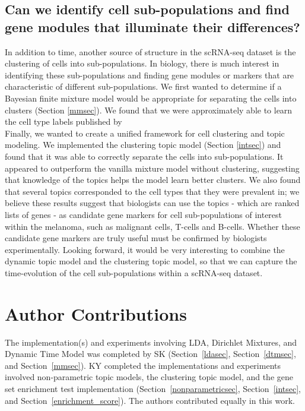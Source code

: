 \documentclass{article}
\begin{document}
\subsection{Can we identify cell sub-populations and find gene modules that illuminate their differences?}
In addition to time, another source of structure in the scRNA-seq dataset is the clustering of cells into sub-populations. In biology, there is much interest in identifying these sub-populations and finding gene modules or markers that are characteristic of different sub-populations. We first wanted to determine if a Bayesian finite mixture model would be appropriate for separating the cells into clusters (Section \ref{mmsec}). We found that we were approximately able to learn the cell type labels published by \cite{melanoma}\\

Finally, we wanted to create a unified framework for cell clustering and topic modeling. We implemented the clustering topic model (Section \ref{intsec}) and found that it was able to correctly separate the cells into sub-populations. It appeared to outperform the vanilla mixture model without clustering, suggesting that knowledge of the topics helps the model learn better clusters. We also found that several topics corresponded to the cell types that they were prevalent in; we believe these results suggest that biologists can use the topics - which are ranked lists of genes - as candidate gene markers for cell sub-populations of interest within the melanoma, such as malignant cells, T-cells and B-cells. Whether these candidate gene markers are truly useful must be confirmed by biologists experimentally. Looking forward, it would be very interesting to combine the dynamic topic model and the clustering topic model, so that we can capture the time-evolution of the cell sub-populations within a scRNA-seq dataset. 


\section{Author Contributions}
The implementation(s) and experiments involving LDA, Dirichlet Mixtures, and Dynamic Time Model was completed by SK (Section~\ref{ldasec}, Section~\ref{dtmsec}, and Section~\ref{mmsec}). KY completed the implementations and experiments involved non-parametric topic models, the clustering topic model, and the gene set enrichment test implementation (Section~\ref{nonparametricsec}, Section~\ref{intsec}, and Section~\ref{enrichment_score}). The authors contributed equally in this work.
\end{document}
